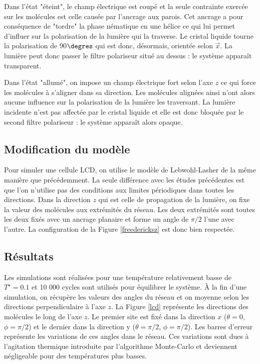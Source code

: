 \documentclass[11pt,a4paper]{article}
\numberwithin{equation}{section}
\begin{document}
Dans l'état "éteint", le champ électrique est coupé et la seule contrainte exercée sur les molécules est celle causée par l'ancrage aux parois. Cet ancrage a pour conséquence de "tordre" la phase nématique en une hélice ce qui lui permet d'influer sur la polarisation de la lumière qui la traverse. Le cristal liquide tourne la polarisation de 90$\degres$ qui est donc, désormais, orientée selon $\vec{x}$. La lumière peut donc passer le filtre polariseur situé au dessus : le système apparaît transparent.
\medskip

Dans l'état "allumé", on impose un champ électrique fort selon l'axe $z$ ce qui force les molécules à s'aligner dans sa direction. Les molécules alignées ainsi n'ont alors aucune influence sur la polarisation de la lumière les traversant. La lumière incidente n'est pas affectée par le cristal liquide et elle est donc bloquée par le second filtre polariseur : le système apparaît alors opaque.
\medskip

\subsection{Modification du modèle}

Pour simuler une cellule LCD, on utilise le modèle de Lebwohl-Lasher de la même manière que précédemment. La seule différence avec les études précédentes est que l'on n'utilise pas des conditions aux limites périodiques dans toutes les directions. Dans la direction $z$ qui est celle de propagation de la lumière, on fixe la valeur des molécules aux extrémités du réseau. Les deux extrémités sont toutes les deux fixés avec un ancrage planaire et forme un angle de $\pi/2$ l'une avec l'autre. La configuration de la Figure \ref{freedericksz} est donc bien respectée.

\subsection{Résultats}

Les simulations sont réalisées pour une température relativement basse de $T^\star =0.1$ et 10 000 cycles sont utilisés pour équilibrer le système. À la fin d'une simulation, on récupère les valeurs des angles du réseau et on moyenne selon les directions perpendiculaire à l'axe $z$. La Figure \ref{lcd} représente les directions des molécules le long de l'axe $z$. Le premier site est fixé dans la direction $x$ ($\theta = 0$, $\phi=\pi/2$) et le dernier dans la direction y ($\theta = \pi/2$, $\phi=\pi/2$). Les barres d'erreur représente les variations de ces angles dans le réseau. Ces variations sont dues à l'agitation thermique introduite par l'algorithme Monte-Carlo et deviennent négligeable pour des températures plus basses.
\end{document}
